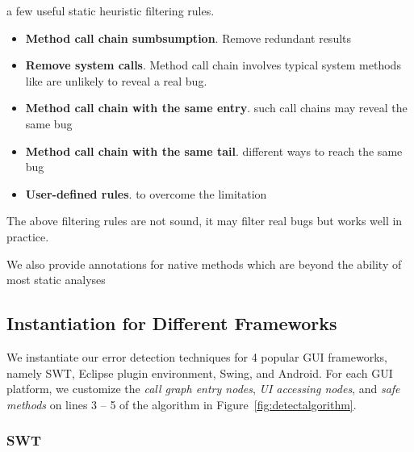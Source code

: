 a few useful static heuristic filtering rules.

\begin{itemize}
\item \textbf{Method call chain sumbsumption}. Remove redundant
results

\item \textbf{Remove system calls}. Method call chain involves typical
system methods like  are unlikely to reveal a real bug.

\item \textbf{Method call chain with the same entry}. such
call chains may reveal the same bug

\item \textbf{Method call chain with the same tail}.  different ways
to reach the same bug

\item \textbf{User-defined rules}.  to overcome the limitation

\end{itemize}

The above filtering rules are not sound, it may filter real bugs but works
well in practice.

We also provide annotations for native methods which are beyond the ability
of most static analyses

\subsection{Instantiation for Different Frameworks}
\label{sec:platforms}

We instantiate our error detection techniques for 4 popular GUI frameworks,
namely SWT, Eclipse plugin environment, Swing, and Android.
For each GUI platform, we customize the \textit{call graph entry nodes},
\textit{UI accessing nodes}, and \textit{safe methods} on lines 3 -- 5 of the
algorithm in Figure~\ref{fig:detectalgorithm}.




\subsubsection{SWT}

